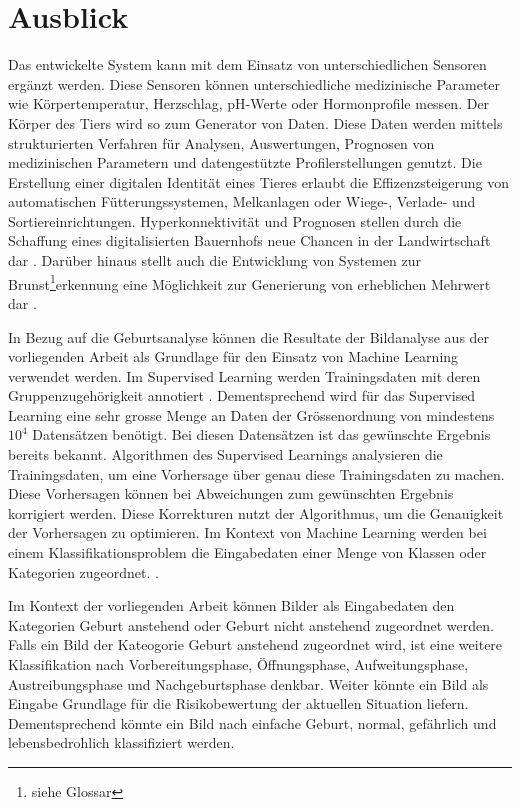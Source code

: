 

\chapter{Ausblick}
Das entwickelte System kann mit dem Einsatz von unterschiedlichen Sensoren ergänzt werden. Diese Sensoren können unterschiedliche medizinische Parameter wie Körpertemperatur, Herzschlag,  pH-Werte oder Hormonprofile messen. Der Körper des Tiers wird so zum Generator von Daten. Diese Daten werden mittels strukturierten Verfahren für Analysen, Auswertungen, Prognosen von medizinischen Parametern und datengestützte Profilerstellungen genutzt. Die Erstellung einer digitalen Identität eines Tieres erlaubt die Effizenzsteigerung von automatischen Fütterungssystemen, Melkanlagen oder Wiege-, Verlade- und Sortiereinrichtungen. Hyperkonnektivität und Prognosen stellen durch die Schaffung eines digitalisierten Bauernhofs neue Chancen in der Landwirtschaft dar \citep[S. 308 ff.]{Kasprowicz2019}. Darüber hinaus stellt auch die Entwicklung von Systemen zur \gls{Brunst}\footnote{\label{glossar-brunst}siehe Glossar}erkennung eine Möglichkeit zur Generierung von erheblichen Mehrwert dar \citep{Hirsbrunner2020}.


In Bezug auf die Geburtsanalyse können die Resultate der Bildanalyse aus der vorliegenden Arbeit als Grundlage für den Einsatz von Machine Learning verwendet werden.
Im Supervised Learning werden Trainingsdaten mit deren Gruppenzugehörigkeit annotiert \citep[S. 253]{Firouzi2020}. 
Dementsprechend wird für das Supervised Learning eine sehr grosse Menge an Daten der Grössenordnung von mindestens ${10^4}$ Datensätzen benötigt. Bei diesen Datensätzen ist das gewünschte Ergebnis bereits bekannt. Algorithmen des Supervised Learnings analysieren die Trainingsdaten, um eine Vorhersage über genau diese Trainingsdaten zu machen. Diese Vorhersagen können bei Abweichungen zum gewünschten Ergebnis korrigiert werden. Diese Korrekturen nutzt der Algorithmus, um die Genauigkeit der Vorhersagen zu optimieren. Im Kontext von Machine Learning werden bei einem Klassifikationsproblem die Eingabedaten einer Menge von Klassen oder Kategorien zugeordnet. \citep[S. 440]{FernandezVillan2019}.

Im Kontext der vorliegenden Arbeit können Bilder als Eingabedaten den Kategorien \glqq Geburt anstehend\grqq{} oder \glqq Geburt nicht anstehend\grqq{} zugeordnet werden. Falls ein Bild der Kateogorie \glqq Geburt anstehend\grqq{} zugeordnet wird, ist eine weitere Klassifikation nach \glqq Vorbereitungsphase\grqq{}, \glqq Öffnungsphase\grqq{}, \glqq Aufweitungsphase\grqq{}, \glqq Austreibungsphase\grqq{} und \glqq Nachgeburtsphase\grqq{} denkbar. Weiter könnte ein Bild als Eingabe Grundlage für die Risikobewertung der aktuellen Situation liefern. Dementsprechend könnte ein Bild nach \glqq einfache Geburt\grqq{}, \glqq normal\grqq{}, \glqq gefährlich\grqq{} und \glqq lebensbedrohlich\grqq{} klassifiziert werden. 

